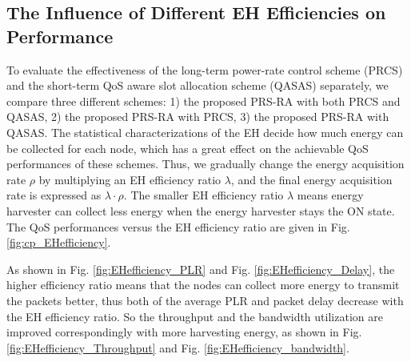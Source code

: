 \documentclass[journal,10pt]{IEEEtran}
\begin{document}
\subsection{The Influence of Different EH Efficiencies on Performance}
To evaluate the effectiveness of the long-term power-rate control scheme (PRCS) and the short-term QoS aware slot allocation scheme (QASAS) separately, we compare three different schemes: 1) the proposed PRS-RA with both PRCS and QASAS, 2) the proposed PRS-RA with PRCS, 3) the proposed PRS-RA with QASAS. 
The statistical characterizations of the EH decide how much energy can be collected for each node, which has a great effect on the achievable QoS performances of these schemes. Thus, we gradually change the energy acquisition rate $\rho$ by multiplying an EH efficiency ratio $\lambda$, and the final energy acquisition rate is expressed as $\lambda \cdot \rho$. The smaller EH efficiency ratio $\lambda$ means energy harvester can collect less energy when the energy harvester stays the ON state. The QoS performances versus the EH efficiency ratio are given in Fig. \ref{fig:cp_EHefficiency}.

As shown in Fig. \ref{fig:EHefficiency_PLR} and Fig. \ref{fig:EHefficiency_Delay}, the higher efficiency ratio means that the nodes can collect more energy to transmit the packets better, thus both of the average PLR and packet delay decrease with the EH efficiency ratio. So the throughput and the bandwidth utilization are improved correspondingly with more harvesting energy, as shown in Fig. \ref{fig:EHefficiency_Throughput} and Fig. \ref{fig:EHefficiency_bandwidth}.
\end{document}
